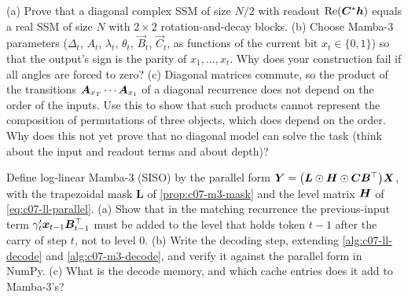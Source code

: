 \begin{exercise}\label{ex:c07-rotation}
(a) Prove that a diagonal complex SSM of size $N/2$ with readout $\operatorname{Re}(\bm{C}^*\bm{h})$
equals a real SSM of size $N$ with $2\times2$ rotation-and-decay blocks.
(b) Choose Mamba-3 parameters ($\Delta_t$, $A_t$, $\lambda_t$, $\theta_t$, $\vec B_t$, $\vec C_t$, as
functions of the current bit $x_t\in\{0,1\}$) so that the output's sign is the parity of
$x_1,\dots,x_t$. Why does your construction fail if all angles are forced to zero?
(c) Diagonal matrices commute, so the product of the transitions $\bm{A}_{x_T}\cdots\bm{A}_{x_1}$ of a
diagonal recurrence does not depend on the order of the inputs. Use this to show that such
products cannot represent the composition of permutations of three objects, which does
depend on the order. Why does this not yet prove that no diagonal model can solve the task
(think about the input and readout terms and about depth)?
\end{exercise}

\begin{exercise}\label{ex:c07-compose}
Define log-linear Mamba-3 (SISO) by the parallel form
$\bm{Y} = \bigl(\bm{L}\odot\bm{H}\odot\bm{C}\bm{B}^{\top}\bigr)\bm{X}$, with the trapezoidal mask $\bm{L}$ of
\cref{prop:c07-m3-mask} and the level matrix $\bm{H}$ of \cref{eq:c07-ll-parallel}.
(a) Show that in the matching recurrence the previous-input term
$\gamma'_t\bm{x}_{t-1}\bm{B}_{t-1}^{\top}$ must be added to the level that holds token $t-1$ after the
carry of step $t$, not to level $0$. (b) Write the decoding step, extending
\cref{alg:c07-ll-decode} and \cref{alg:c07-m3-decode}, and verify it against the parallel form in
NumPy. (c) What is the decode memory, and which cache entries does it add to Mamba-3's?
\end{exercise}
